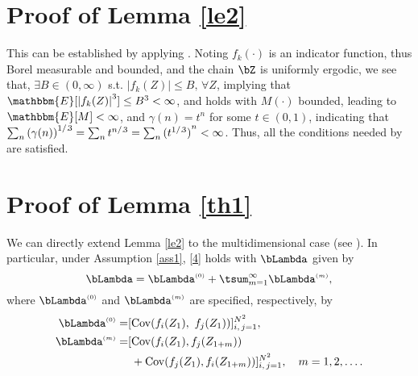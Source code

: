 \documentclass[10pt, twocolumn]{IEEEtran}
\begin{document}
\section{Proof of Lemma \ref{le2}}  \label{sec:lem2}

This can be established by applying \cite[Corollary
1]{jones2004markov}. Noting $f_k(\cdot)$ is an indicator function, thus
Borel measurable and bounded, and the chain $\bZ$ is uniformly ergodic,
we see that, $\exists B \in ( {0,\infty })$ s.t. $|
  {{f_k}( Z )} | \leq B, \, \forall Z$, implying that
$\mathbbm{E}[ {{{| {{f_k}( Z)}|}^3}} ] \leq {B^3} < \infty $, and
\cite[(3)]{jones2004markov} holds 
with $M(\cdot)$ bounded, leading to $\mathbbm{E}[ M ] <
\infty $, and $\gamma(n) = t^n$ for some $t \in (0, 1)$, indicating that
$\sum\nolimits_n {{{( {\gamma ( n )} )}^{{1
        \mathord{/ {\vphantom {1 3}} .
          \kern-\nulldelimiterspace} 3}}}} = \sum\nolimits_n {{t^{{n
        \mathord{/ {\vphantom {n 3}} .
          \kern-\nulldelimiterspace} 3}}}} = \sum\nolimits_n {{{(
        {{t^{{1 \mathord{/ {\vphantom {1 3}} .
                  \kern-\nulldelimiterspace} 3}}}} )}^n}} < \infty
$. Thus, all the conditions needed by \cite[Corollary
1]{jones2004markov} are satisfied.


\section{Proof of Lemma \ref{th1}}  \label{sec:thm1}

We can directly extend Lemma \ref{le2} to the multidimensional case (see
\cite[Chap. 8]{GeyerCourseNotes}). In particular, under
Assumption \ref{ass1}, \eqref{4} holds with $\bLambda$ given by
\begin{equation} 
\bLambda =  {\bLambda ^{\scriptscriptstyle{(0)}}} + \tsum_{m =
  1}^\infty  {{\bLambda ^{\scriptscriptstyle{(m)}}}}, 
\label{40}
\end{equation}
where ${\bLambda ^{\scriptscriptstyle{(0)}}}$ and ${\bLambda
  ^{\scriptscriptstyle{(m)}}}$ are specified, respectively,
by 
\begin{align*}
{\bLambda ^{\scriptscriptstyle{(0)}}} = & [ {\operatorname{Cov} (
  {{f_i}( {{Z_1}} ),~{f_j}( {{Z_1}} )} )} ]_{i,\,j = 1}^{{N^2}},\\
{\bLambda ^{\scriptscriptstyle{(m)}}} = &  [{\mathop{\rm Cov}\nolimits} ( {{f_i}( {{Z_1}} ),{f_j}( {{Z_{1 + m}}} )} ) \notag\\
 & \phantom{[ } 
+ {\mathop{\rm Cov}\nolimits} ( {{f_j}( {{Z_1}} ),{f_i}( {{Z_{1 + m}}}
  )} )]_{i,\,j = 1}^{{N^2}},
 \quad m = 1,2, \ldots . \notag
\end{align*}
\end{document}

